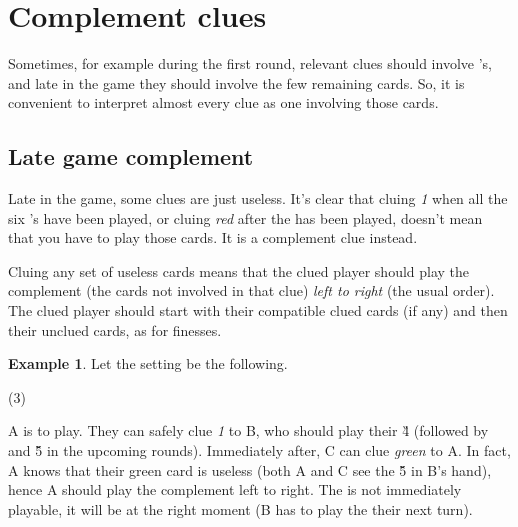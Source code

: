 \documentclass[a4paper]{article}
\theoremstyle{plain}
\theoremstyle{definition}
\newtheorem{example}[theorem]{Example}
\begin{document}
\section{Complement clues}

Sometimes, for example during the first round, relevant clues should involve 's, and late in the game they should involve the few remaining cards. So, it is convenient to interpret almost every clue as one involving those cards.

\subsection{Late game complement}

Late in the game, some clues are just useless. It's clear that cluing \textit{1} when all the six 's have been played, or cluing \textit{red} after the  has been played, doesn't mean that you have to play those cards. It is a complement clue instead.

Cluing any set of useless cards means that the clued player should play the complement (the cards not involved in that clue) \textit{left to right} (the usual order). The clued player should start with their compatible clued cards (if any) and then their unclued cards, as for finesses.

\begin{example}
	
	Let the setting be the following.
	
	\begin{tasks}(3)
		\task[+]      
		\task[A]    
		\task[B]    
		\task[C]    
		\task[D]    
		\task[E]    
	\end{tasks}
	
	A is to play. They can safely clue \textit{1} to B, who should play their \G{4} (followed by  and \G{5} in the upcoming rounds). Immediately after, C can clue \textit{green} to A. In fact, A knows that their green card is useless (both A and C see the \G{5} in B's hand), hence A should play the complement left to right. The  is not immediately playable, it will be at the right moment (B has to play the  their next turn).
\end{example}
\end{document}
